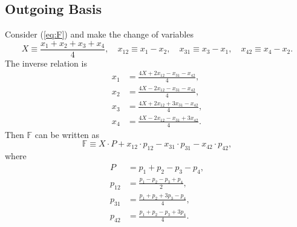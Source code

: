 \subsection{Outgoing Basis}
Consider (\ref{eq:F}) and make the change of variables
\begin{equation}
	X \equiv \frac{x_{1} + x_{2} + x_{3} + x_{4}}{4}, \quad x_{12} \equiv x_{1} - x_{2}, \quad x_{31} \equiv x_{3} - x_{1}, \quad x_{42} \equiv x_{4} - x_{2}.
\end{equation}
The inverse relation is
\begin{align}
	x_{1} &= \frac{4 X + 2x_{12} - x_{31} - x_{42}}{4}, \\
	x_{2} &= \frac{4 X - 2x_{12} - x_{31} - x_{42}}{4}, \\
	x_{3} &= \frac{4 X + 2x_{12} + 3x_{31} - x_{42}}{4}, \\
	x_{4} &= \frac{4 X - 2x_{12} - x_{31} + 3x_{42}}{4}.
\end{align}
Then $\mathbb{F}$ can be written as
\begin{equation}
	\mathbb{F} \equiv X \cdot P + x_{12} \cdot p_{12} - x_{31} \cdot p_{31} - x_{42} \cdot p_{42},
\end{equation}
where
\begin{align}
	P &= p_{1} + p_{2} - p_{3} - p_{4}, \\
	p_{12} &= \frac{p_{1} - p_{2} - p_{3} + p_{4}}{2}, \\
	p_{31} &= \frac{p_{1} + p_{2} + 3p_{3} - p_{4}}{4}, \\
	p_{42} &= \frac{p_{1} + p_{2} - p_{3} + 3p_{4}}{4}.
\end{align}

